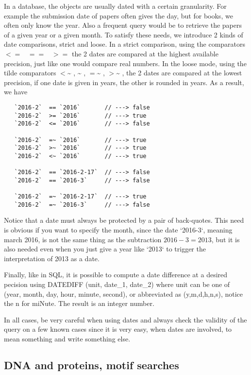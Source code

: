 \documentclass[11pt]{article}
\newcommand{\BL}{\begin{lstlisting}}
\begin{document}
In a database, the objects are usually dated with a certain granularity. For example
the submission date of papers often gives the day, but for books, we often only know the year.
Also a frequent query would be to retrieve the papers of a  given year or a given month.
To satisfy these needs, we introduce 2 kinds of date comparisons, strict and loose.
In a strict comparison, using the comparators $<=  \;\;\;  == \;\;\;  >=$  the 2 dates
are compared at the  highest available precision, just like one would compare real numbers.
In the loose mode, using the tilde comparators $<$\~{} ,  \~{} , $=$\~{} , $>$\~{} ,  the 2 dates
are compared at the  lowest precision, if one date is given in years, the
other is rounded in years. As a result, we have
\BL
   `2016-2`  == `2016`       // ---> false
   `2016-2`  >= `2016`       // ---> true
   `2016-2`  <= `2016`       // ---> false

   `2016-2`  =~ `2016`       // ---> true
   `2016-2`  >~ `2016`       // ---> true
   `2016-2`  <~ `2016`       // ---> true

   `2016-2`  == `2016-2-17`  // ---> false
   `2016-2`  == `2016-3`     // ---> false

   `2016-2`  =~ `2016-2-17`  // ---> true
   `2016-2`  =~ `2016-3`     // ---> false
\end{lstlisting}

Notice that a date must always be protected by a pair of back-quotes. This need is obvious if you want to specify the month, 
since the date `2016-3`, meaning march 2016, is not the same thing as the subtraction $ 2016 - 3 = 2013$,
but it is also needed even when you just give a year like `2013` to trigger the interpretation
of 2013 as a date.

Finally, like in SQL, it is possible to compute a date difference at a desired pecision using
DATEDIFF (unit, date\_1, date\_2) where unit can be one of
(year, month, day, hour, minute, second), or abbreviated as (y,m,d,h,n,s),
notice the n for miNute. The result is an integer number.

In all cases, be very careful when using dates and always check the validity of the query on a few known cases
since it is very easy, when dates are involved, to mean something and write something else.

\subsection{DNA and proteins, motif searches}
\end{document}

